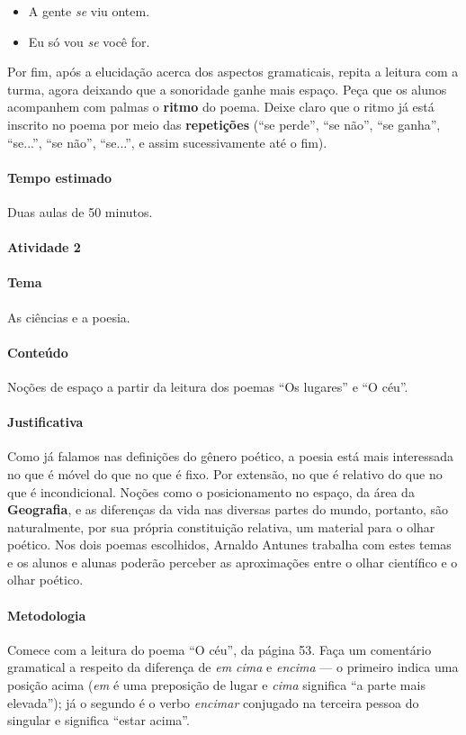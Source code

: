 \documentclass[11pt]{extarticle}
\begin{document}
\begin{itemize}
	\item A gente \textit{se} viu ontem.
	\item Eu só vou \textit{se} você for.
\end{itemize}

Por fim, após a elucidação acerca dos aspectos gramaticais,
repita a leitura com a turma, agora deixando que a 
sonoridade ganhe mais espaço.
Peça que os alunos acompanhem com palmas o \textbf{ritmo} do poema. 
Deixe claro que o ritmo já está inscrito no poema por meio das 
\textbf{repetições} (``se perde'', ``se não'', ``se ganha'', ``se...'', ``se não'', ``se...'', 
e assim sucessivamente até o fim).


\paragraph{Tempo estimado} Duas aulas de 50 minutos.

\paragraph{Atividade 2}

\paragraph{Tema} As ciências e a poesia. 

\paragraph{Conteúdo} Noções de espaço a partir da leitura dos poemas ``Os lugares'' e ``O céu''.

\paragraph{Justificativa} Como já falamos nas definições do gênero poético,
a poesia está mais interessada no que é móvel do que no que é fixo. 
Por extensão, no que é relativo do que no que é incondicional. 
Noções como o posicionamento no espaço, da área da \textbf{Geografia}, 
e as diferenças da vida nas diversas partes do mundo, portanto,
são naturalmente, por sua própria constituição relativa, 
um material para o olhar poético. 
Nos dois poemas escolhidos, Arnaldo Antunes trabalha 
com estes temas e os alunos e alunas poderão perceber 
as aproximações entre o olhar científico e o olhar poético. 

\paragraph{Metodologia} Comece com a leitura do poema ``O céu'', da página 53.
Faça um comentário gramatical a respeito da diferença de \textit{em cima}
e \textit{encima} --- o primeiro indica uma posição acima (\textit{em} é uma preposição de lugar
e \textit{cima} significa ``a parte mais elevada''); já o segundo é o
verbo \textit{encimar} conjugado na terceira pessoa do singular e significa
``estar acima''.
\end{document}
